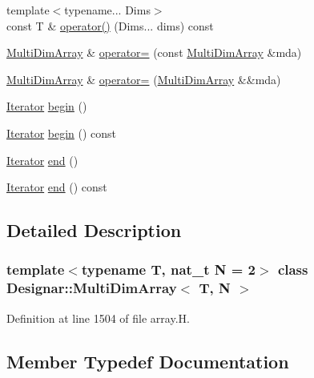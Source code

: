 \begin{DoxyCompactItemize}
\item 
{\footnotesize template$<$typename... Dims$>$ }\\const T \& \hyperlink{class_designar_1_1_multi_dim_array_a1edce0b31104f2b50bd8f8047e373b78}{operator()} (Dims... dims) const
\item 
\hyperlink{class_designar_1_1_multi_dim_array}{Multi\+Dim\+Array} \& \hyperlink{class_designar_1_1_multi_dim_array_a4f191233c720bc670a181682b0452347}{operator=} (const \hyperlink{class_designar_1_1_multi_dim_array}{Multi\+Dim\+Array} \&mda)
\item 
\hyperlink{class_designar_1_1_multi_dim_array}{Multi\+Dim\+Array} \& \hyperlink{class_designar_1_1_multi_dim_array_a45e425f7a1795d97822d8fafe5c02244}{operator=} (\hyperlink{class_designar_1_1_multi_dim_array}{Multi\+Dim\+Array} \&\&mda)
\item 
\hyperlink{class_designar_1_1_multi_dim_array_1_1_iterator}{Iterator} \hyperlink{class_designar_1_1_multi_dim_array_adaed0d8dcdb5500e751f27418e914c4d}{begin} ()
\item 
\hyperlink{class_designar_1_1_multi_dim_array_1_1_iterator}{Iterator} \hyperlink{class_designar_1_1_multi_dim_array_ad3760c3ce200ee63585ab7c7841b433d}{begin} () const
\item 
\hyperlink{class_designar_1_1_multi_dim_array_1_1_iterator}{Iterator} \hyperlink{class_designar_1_1_multi_dim_array_a6fc4ca23162a6b285f2a6fd698232459}{end} ()
\item 
\hyperlink{class_designar_1_1_multi_dim_array_1_1_iterator}{Iterator} \hyperlink{class_designar_1_1_multi_dim_array_a83200332e5914f2485d64cedb87b9470}{end} () const
\end{DoxyCompactItemize}


\subsection{Detailed Description}
\subsubsection*{template$<$typename T, nat\+\_\+t N = 2$>$\newline
class Designar\+::\+Multi\+Dim\+Array$<$ T, N $>$}



Definition at line 1504 of file array.\+H.



\subsection{Member Typedef Documentation}
\mbox{\label{class_designar_1_1_multi_dim_array_a23b3bec3a6a803d8ef7becceb592d6c0}} 
